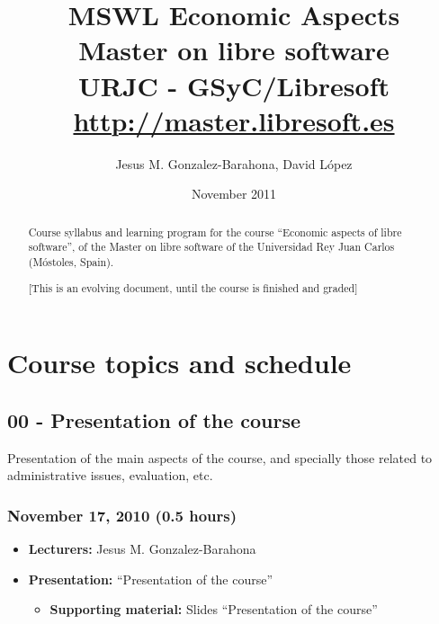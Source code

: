 \documentclass[a4paper]{article}
\title{MSWL Economic Aspects \\
Master on libre software \\
URJC - GSyC/Libresoft \\
\url{http://master.libresoft.es}}
\author{Jesus M. Gonzalez-Barahona, David López}
\date{November 2011}
\begin{document}
\maketitle

\begin{abstract}
Course syllabus and learning program for the course ``Economic aspects of libre software'', of the Master on libre software of the Universidad Rey Juan Carlos (Móstoles, Spain).

[This is an evolving document, until the course is finished and graded]
\end{abstract}

\tableofcontents

\section{Course topics and schedule}

\subsection{00 - Presentation of the course}

Presentation of the main aspects of the course, and specially those related to administrative issues, evaluation, etc.

\subsubsection{November 17, 2010 (0.5 hours)}

\begin{itemize}
\item \textbf{Lecturers:} Jesus M. Gonzalez-Barahona
\item \textbf{Presentation:} ``Presentation of the course''
  \begin{itemize}
  \item \textbf{Supporting material:} Slides ``Presentation of the course''
  \end{itemize}
\end{itemize}

\end{document}
